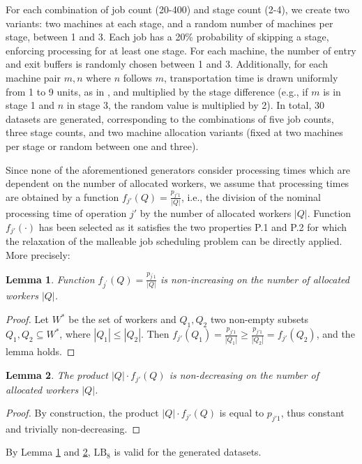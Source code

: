 \documentclass[a4paper,final]{article}
\newtheorem{lemma}{Lemma}
\begin{document}
        For each combination of job count (20-400) and stage count (2-4), we create two variants: two machines at each stage, and a random number of machines per stage, between 1 and 3. Each job has a 20\% probability of skipping a stage, enforcing processing for at least one stage. For each machine, the number of entry and exit buffers is randomly chosen between 1 and 3. Additionally, for each machine pair $m, n$ where $n$ follows $m$, transportation time is drawn uniformly from 1 to 9 units, as in \cite{armstrong2021hybrid}, and multiplied by the stage difference (e.g., if $m$ is in stage 1 and $n$ in stage 3, the random value is multiplied by 2). In total, 30 datasets are generated, corresponding to the combinations of five job counts, three stage counts, and two machine allocation variants (fixed at two machines per stage or random between one and three).
        
         Since none of the aforementioned generators consider processing times which are dependent on the number of allocated workers, we assume that processing times are obtained by a function $f_{j'}(Q) = \frac{p_{j'1}}{|Q|}$, i.e., the division of the nominal processing time of operation $j'$ by the number of allocated workers $|Q|$. Function $f_{j'}(\cdot)$ has been selected as it satisfies the two properties P.1 and P.2 for which the relaxation of the malleable job scheduling problem can be directly applied. More precisely:

        \begin{lemma}
            Function $f_{j^\prime}(Q) = \frac{p_{j^{\prime}1}}{|Q|}$ is non-increasing on the number of allocated workers $|Q|$. \label{lem:1}
        \end{lemma}
        \begin{proof}
            Let $W^{*}$ be the set of workers and $Q_1, Q_2$ two non-empty subsets $Q_1, Q_2\subseteq W^*$, where $|Q_1|\leq |Q_2|$.  Then $f_{j'}(Q_1) = \frac{p_{j'1}}{|Q_1|}\geq \frac{p_{j'1}}{|Q_2|} = f_{j'}(Q_2)$, and the lemma holds.
        \end{proof}

        \begin{lemma}
            The product $|Q|\cdot f_{j'}(Q)$ is non-decreasing on the number of allocated workers $|Q|$. \label{lem:2}
        \end{lemma}
        \begin{proof}
            By construction, the product $|Q|\cdot f_{j'}(Q)$ is equal to $p_{j'1}$, thus constant and trivially non-decreasing.
        \end{proof}
        \noindent By Lemma \ref{lem:1} and \ref{lem:2}, $\text{LB}_{8}$ is valid for the generated datasets.
\end{document}
